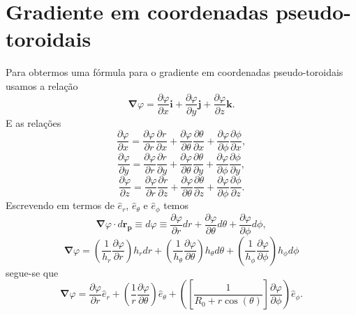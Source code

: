\documentclass[12pt,oneside,a4paper]{abntex2}
\begin{document}
\section{Gradiente em coordenadas pseudo-toroidais}
\noindent Para obtermos uma fórmula para o gradiente em coordenadas pseudo-toroidais usamos a relação 
\begin{equation}
\bm{\nabla} \varphi = \dfrac{\partial \varphi}{\partial x} \bm{i}+ \dfrac{\partial \varphi}{\partial y} \bm{j}+\dfrac{\partial \varphi}{\partial z} \bm{k}.
\end{equation}
E as relações
\begin{equation}
\dfrac{\partial \varphi}{\partial x} = \dfrac{\partial \varphi}{\partial r} \dfrac{\partial r}{\partial x} + \dfrac{\partial \varphi}{\partial \theta} \dfrac{\partial \theta}{\partial x} + \dfrac{\partial \varphi}{\partial \phi} \dfrac{\partial \phi}{\partial x},
\end{equation}
\begin{equation}
\dfrac{\partial \varphi}{\partial y} = \dfrac{\partial \varphi}{\partial r} \dfrac{\partial r}{\partial y} + \dfrac{\partial \varphi}{\partial \theta} \dfrac{\partial \theta}{\partial y} + \dfrac{\partial \varphi}{\partial \phi} \dfrac{\partial \phi}{\partial y},
\end{equation}
\begin{equation}
\dfrac{\partial \varphi}{\partial z} = \dfrac{\partial \varphi}{\partial r} \dfrac{\partial r}{\partial z} + \dfrac{\partial \varphi}{\partial \theta} \dfrac{\partial \theta}{\partial z} + \dfrac{\partial \varphi}{\partial \phi} \dfrac{\partial \phi}{\partial z}.
\end{equation}
Escrevendo em termos de $\hat{e}_r$, $\hat{e}_\theta$ e $\hat{e}_\phi$ temos
\begin{equation}
\bm{\nabla} \varphi \cdot d\bm{r_p} \equiv d\varphi \equiv \dfrac{\partial \varphi}{\partial r} dr + \dfrac{\partial \varphi}{\partial \theta} d\theta + \dfrac{\partial \varphi}{\partial \phi} d\phi,
\end{equation}
\begin{equation}
\bm{\nabla}\varphi = \left(\frac{1}{h_r}\dfrac{\partial \varphi}{\partial r} \right) h_r dr + \left(\frac{1}{h_\theta}\dfrac{\partial \varphi}{\partial \theta} \right) h_\theta d\theta + \left(\frac{1}{h_\phi}\dfrac{\partial \varphi}{\partial \phi} \right) h_\phi d\phi
\end{equation}
segue-se que
\begin{equation}
\bm{\nabla} \varphi = \dfrac{\partial \varphi}{\partial r}  \hat{e}_r + \left(\frac{1}{r}\dfrac{\partial \varphi}{\partial \theta} \right) \hat{e}_\theta + \left( \left[ \frac{1}{ R_0 + r \cos(\theta)}\right] \dfrac{\partial \varphi}{\partial \phi}\right) \hat{e}_\phi.
\end{equation}
\end{document}
